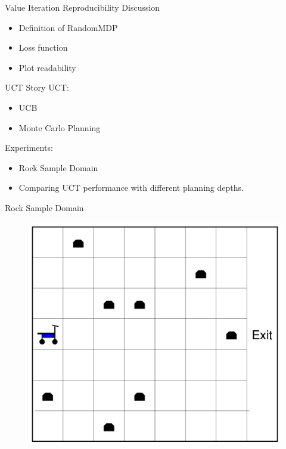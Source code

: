 \documentclass{beamer}
\begin{document}
\begin{frame}{Value Iteration Reproducibility Discussion}
\begin{itemize}\setlength\itemsep{1em}
\item Definition of RandomMDP
\item Loss function 
\item Plot readability 
\end{itemize}
\end{frame}


\begin{frame}{UCT Story}
UCT: 
\begin{itemize}
\item UCB
\item Monte Carlo Planning
\end{itemize}

Experiments:
\begin{itemize}
\item Rock Sample Domain
\item Comparing UCT performance with different planning depths.
\end{itemize}
\end{frame}

\begin{frame}{Rock Sample Domain}

\begin{figure}
\includegraphics[page=1,height=.55\textheight,width=.5\textwidth]{rock_sample_domain.png}
\end{figure}


\end{frame}
\end{document}
